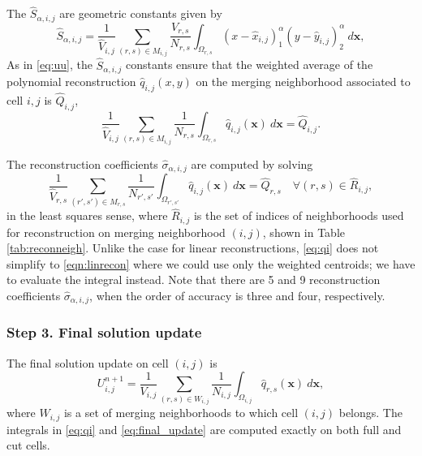 The $ \widehat S_{\alpha, i,j}$ are  geometric constants given by
$$
\widehat S_{\alpha, i,j} = \frac{1}{ \widehat{V}_{i,j}} \sum_{(r,s) \in M_{i,j} }\frac{V_{r,s}}{N_{r,s}} \int_{\Omega_{r,s}} 
(x-\widehat{x}_{i,j})^\alpha_1 (y-\widehat{y}_{i,j})^\alpha_2 
~d\mathbf{x},
$$
As in \eqref{eq:uu}, the $\widehat S_{\alpha, i,j}$ constants 
ensure that the weighted average of the polynomial 
reconstruction $\widehat q_{i,j}(x,y)$ on the merging neighborhood 
associated to cell $i,j$ is $\widehat{Q}_{i,j}$,
\begin{equation} \label{eq:average}
\frac{1}{ \widehat{V}_{i,j}} \sum_{(r,s) \in M_{i,j} }\frac{1}{N_{r,s}} \int_{\Omega_{r,s}} \widehat{q}_{i,j}(\mathbf{x}) ~d\mathbf{x} = \widehat{Q}_{i,j}.
\end{equation}


The reconstruction coefficients $\widehat \sigma_{\alpha,i,j}$ are computed by solving
\begin{equation}\label{eq:qi}
\frac{1}{\widehat{V}_{r,s}}\sum_{(r',s') \in M_{r,s}}\frac{1}{N_{r',s'}}\int_{\Omega_{r',s'}} \widehat q_{i,j}(\mathbf{x})~d\mathbf{x} = \widehat Q_{r,s} \quad \forall (r,s) \in \widehat R_{i,j},
\end{equation}
in the least squares sense, where $\widehat R_{i,j}$ is the set of
indices of neighborhoods used for reconstruction on merging
neighborhood $(i,j)$, shown in  Table \ref{tab:reconneigh}.  
Unlike the case for linear reconstructions, \eqref{eq:qi} does not
simplify to \eqref{eqn:linrecon} where we could use only the  
weighted centroids; we have to evaluate the integral instead.
Note that there are 5 and 9 reconstruction coefficients $\widehat{\sigma}_{\alpha, i,j}$, when the order of accuracy is three and four, respectively.

\subsubsection*{Step 3. Final solution update}
The final solution update on cell $(i,j)$ is
	\begin{equation}\label{eq:final_update}
	U^{n+1}_{i,j} =  \frac{1}{V_{i,j}}\sum_{(r,s) \in W_{i,j}}\frac{1}{N_{i,j}}\int_{\Omega_{i,j}} \widehat q_{r,s}(\mathbf{x})~d\mathbf{x} ,
	\end{equation}
	where $W_{i,j}$ is a set of merging neighborhoods to which cell $(i,j)$ belongs.
The integrals in \eqref{eq:qi} and \eqref{eq:final_update} are computed exactly on both full and cut cells.  

